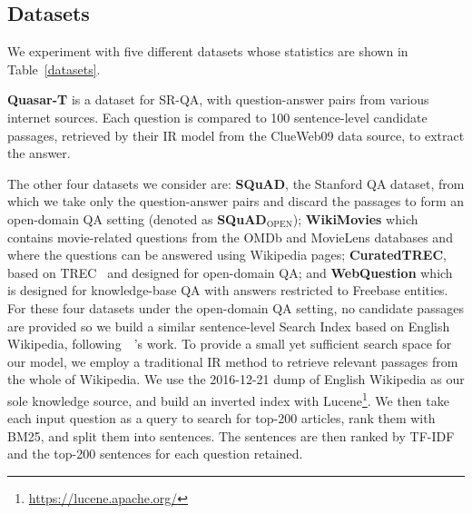 \documentclass[letterpaper]{article} %
\begin{document}
\subsection{Datasets}
We experiment with five different datasets whose statistics are shown in Table~\ref{datasets}.


\textbf{Quasar-T} is a dataset for
SR-QA, with
question-answer pairs from various internet sources. %
Each question is compared to 100 sentence-level candidate passages, retrieved by their IR model from the ClueWeb09 data source, to extract the answer. 

The other four datasets we consider are: \textbf{SQuAD}, the Stanford QA dataset, from which we take only the question-answer pairs and discard the passages to form an open-domain QA setting (denoted as \textbf{SQuAD$_{\textrm{OPEN}}$});
\textbf{WikiMovies} which contains movie-related questions from the OMDb and MovieLens databases and where the questions can be answered using Wikipedia pages; \textbf{CuratedTREC}, based on TREC~\cite{voorhees2000building} and designed for open-domain QA; and \textbf{WebQuestion} which is designed for knowledge-base QA with answers restricted to Freebase entities.
% 
For these four datasets under the open-domain QA setting, no candidate passages are provided so we build a similar sentence-level Search Index based on English Wikipedia,
following~\citeauthor{chen2017reading}~\citeyear{chen2017reading}'s work.
To provide a small yet sufficient search space for our model, we employ a traditional %
IR method to retrieve relevant passages from the whole of Wikipedia. We use the 2016-12-21 dump of English Wikipedia as our sole knowledge source, and build an inverted index with Lucene\footnote{\url{https://lucene.apache.org/}}. We then take each input question as a query to search for top-200 articles, rank them with BM25, and split them into sentences.  The sentences are then ranked by TF-IDF and the top-200 sentences for each question retained.
\end{document}
